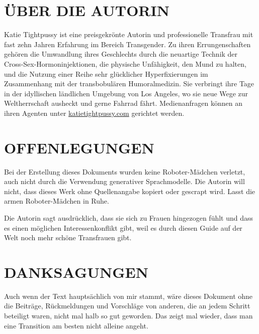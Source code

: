 \documentclass{article}
\begin{document}
\section*{ÜBER DIE AUTORIN}

Katie Tightpussy ist eine preisgekrönte Autorin und professionelle Transfrau mit fast zehn Jahren Erfahrung im Bereich Transgender. Zu ihren Errungenschaften gehören die Umwandlung ihres Geschlechts durch die neuartige Technik der Cross-Sex-Hormoninjektionen, die physische Unfähigkeit, den Mund zu halten, und die Nutzung einer Reihe sehr glücklicher Hyperfixierungen im Zusammenhang mit der transbobulären Humoralmedizin. Sie verbringt ihre Tage in der idyllischen ländlichen Umgebung von Los Angeles, wo sie neue Wege zur Weltherrschaft ausheckt und gerne Fahrrad fährt. Medienanfragen können an ihren Agenten unter \href{http://katietightpussy.com}{katietightpussy.com} gerichtet werden.


\section*{OFFENLEGUNGEN}

Bei der Erstellung dieses Dokuments wurden keine Roboter-Mädchen verletzt, auch nicht durch die Verwendung generativer Sprachmodelle. Die Autorin will nicht, dass dieses Werk ohne Quellenangabe kopiert oder gescrapt wird. Lasst die armen Roboter-Mädchen in Ruhe.

Die Autorin sagt ausdrücklich, dass sie sich zu Frauen hingezogen fühlt und dass es einen möglichen Interessenkonflikt gibt, weil es durch diesen Guide auf der Welt noch mehr schöne Transfrauen gibt.

 

\section*{DANKSAGUNGEN}

Auch wenn der Text hauptsächlich von mir stammt, wäre dieses Dokument ohne die Beiträge, Rückmeldungen und Vorschläge von anderen, die an jedem Schritt beteiligt waren, nicht mal halb so gut geworden. Das zeigt mal wieder, dass man eine Transition  am besten nicht alleine angeht.
\end{document}
